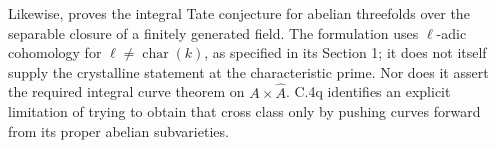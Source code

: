 Likewise, \citet[Theorem 7.1 and Proposition 7.2, pp.~17--19 of
the opened author version]{frC4Totaro2021} proves the integral
Tate conjecture for abelian threefolds over the separable
closure of a finitely generated field. The formulation uses
$\ell$-adic cohomology for $\ell\ne\operatorname{char}(k)$,
as specified in its Section 1; it does not itself supply the
crystalline statement at the characteristic prime.
Nor does it assert the required integral curve theorem on
$A\times\widehat A$. C.4q identifies an explicit limitation of
trying to obtain that cross class only by pushing curves
forward from its proper abelian subvarieties.
